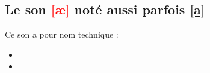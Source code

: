 \subsection{Le son \textcolor{red}{[æ]} noté aussi parfois \textcolor{red}{\href{https://en.oxforddictionaries.com/definition/cat}{[a]}}}\label{sec:sonae}

Ce son a pour nom technique :

\begin{itemize}
\item {}
\item {}
\end{itemize}

\indicsound


